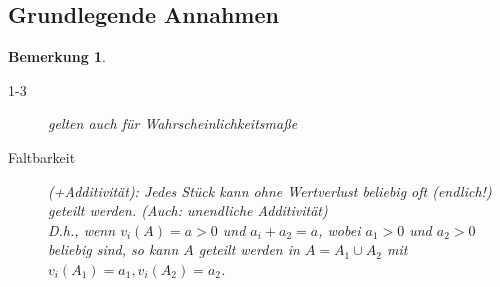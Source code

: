 \documentclass[a4paper,10pt]{scrartcl}
\newtheorem*{bemerkung*}{Bemerkung}
\begin{document}
\subsection{Grundlegende Annahmen}
\begin{bemerkung*}
 \begin{description}
  \item[1-3] gelten auch für Wahrscheinlichkeitsmaße
  \item[Faltbarkeit] (+Additivität): Jedes Stück kann ohne Wertverlust beliebig oft (endlich!) geteilt werden. 
                                     (Auch: unendliche Additivität)\\
                                     D.h., wenn $v_i(A)=a>0$ und $a_i+a_2=a$, wobei $a_1>0$ und $a_2>0$ beliebig sind, so kann $A$ geteilt
                                     werden in $A=A_1\cup A_2$ mit $v_i(A_1)=a_1, v_i(A_2)=a_2$.
 \end{description}
\end{bemerkung*}
\end{document}

